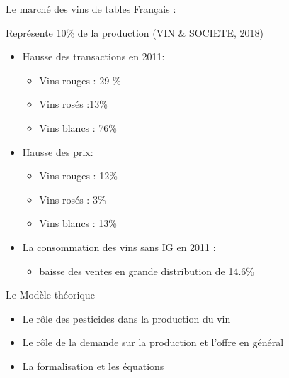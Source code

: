 \documentclass[11pt,ignorenonframetext,]{beamer}
\providecommand{\tightlist}{%
  \setlength{\itemsep}{0pt}\setlength{\parskip}{0pt}}
\begin{document}
\begin{frame}{Le marché des vins de tables Français :}
\protect\hypertarget{le-marche-des-vins-de-tables-francais}{}

Représente 10\% de la production (VIN \& SOCIETE, 2018)

\begin{itemize}
\tightlist
\item
  Hausse des transactions en 2011:

  \begin{itemize}
  \tightlist
  \item
    Vins rouges : 29 \%
  \item
    Vins rosés :13\%
  \item
    Vins blancs : 76\%
  \end{itemize}
\item
  Hausse des prix:

  \begin{itemize}
  \tightlist
  \item
    Vins rouges : 12\%
  \item
    Vins rosés : 3\%
  \item
    Vins blancs : 13\%
  \end{itemize}
\item
  La consommation des vins sans IG en 2011 :

  \begin{itemize}
  \tightlist
  \item
    baisse des ventes en grande distribution de 14.6\%
  \end{itemize}
\end{itemize}

\end{frame}

\begin{frame}{Le Modèle théorique}
\protect\hypertarget{le-modele-theorique}{}

\begin{itemize}
\tightlist
\item
  Le rôle des pesticides dans la production du vin
\item
  Le rôle de la demande sur la production et l'offre en général
\item
  La formalisation et les équations
\end{itemize}

\end{frame}
\end{document}
